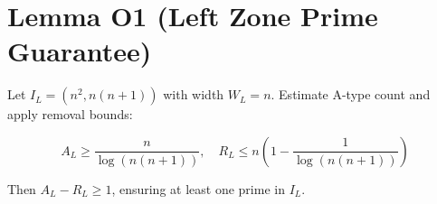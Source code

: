 
\section*{Lemma O1 (Left Zone Prime Guarantee)}

Let \( I_L = (n^2, n(n+1)) \) with width \( W_L = n \).  
Estimate A-type count and apply removal bounds:

\[
A_L \geq \frac{n}{\log(n(n+1))}, \quad R_L \leq n \left(1 - \frac{1}{\log(n(n+1))}\right)
\]

Then \( A_L - R_L \geq 1 \), ensuring at least one prime in \( I_L \).
